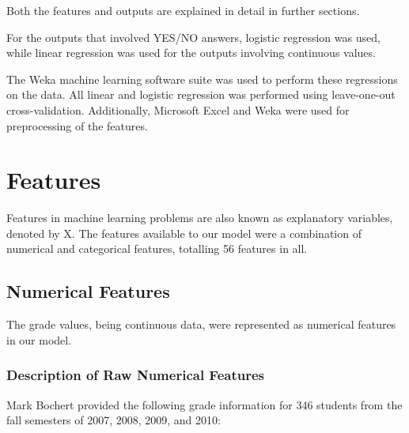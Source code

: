 \documentclass[letterpaper,11pt]{article}
\begin{document}
Both the features and outputs are explained in detail in further sections.

For the outputs that involved YES/NO answers, logistic regression was used, while linear regression was used for the outputs involving continuous values.

The Weka machine learning software suite\cite{weka:weka} was used to perform these regressions on the data.  All linear and logistic regression was performed using leave-one-out cross-validation. Additionally, Microsoft Excel and Weka were used for preprocessing of the features.

\section{Features}

Features in machine learning problems are also known as explanatory variables, denoted by X.  The features available to our model were a combination of numerical and categorical features, totalling 56 features in all.

\subsection{Numerical Features}

The grade values, being continuous data, were represented as numerical features in our model.

\subsubsection{Description of Raw Numerical Features}

Mark Bochert provided the following grade information for 346 students from the fall semesters of 2007, 2008, 2009, and 2010:
\end{document}
